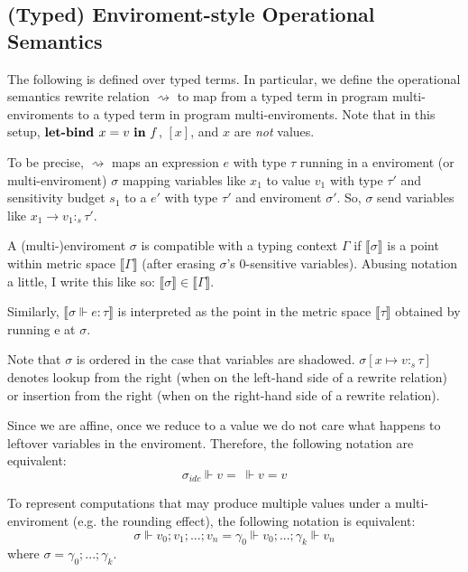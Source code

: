 \subsection{(Typed) Enviroment-style Operational Semantics}
The following is defined over typed terms. In particular, we define the
operational semantics rewrite relation $\rightsquigarrow$ to map from a typed
term in program multi-enviroments to a typed term in program multi-enviroments. Note
that in this setup, $\textbf{let-bind } x = v \ \textbf{in} \ f$, $[x]$, and $x$ are \textit{not}
values.

To be precise, $\rightsquigarrow$ maps an expression $e$ with type $\tau$
running in a enviroment (or multi-enviroment) $\sigma$ mapping variables like
$x_1$ to value $v_1$ with type $\tau'$ and sensitivity budget $s_1$ to a $e'$
with type $\tau'$ and enviroment $\sigma'$. So, $\sigma$ send variables like
$x_1 \to v_1 :_s \tau'$.

A (multi-)enviroment $\sigma$ is compatible with a typing context $\Gamma$ if
$\llbracket \sigma \rrbracket$ is a point within metric space $\llbracket \Gamma
\rrbracket$ (after erasing $\sigma$'s $0$-sensitive variables). Abusing notation
a little, I write this like so: $\llbracket \sigma \rrbracket \in \llbracket
\Gamma \rrbracket$.


Similarly, $\llbracket \sigma \Vdash e : \tau \rrbracket$ is
interpreted as the point in the metric space $\llbracket \tau \rrbracket$
obtained by running e at $\sigma$.

Note that $\sigma$ is ordered in the case that variables are shadowed. $\sigma[x
\mapsto v :_s \tau]$ denotes lookup from the right (when on the left-hand side
of a rewrite relation) or insertion from the right (when on the right-hand side
of a rewrite relation).

Since we are affine, once we reduce to a value we do not care what happens to
leftover variables in the enviroment. Therefore, the following notation are
equivalent:
$$
\sigma_{idc} \Vdash v = \ \Vdash v = v
$$

To represent computations that may produce multiple values under a
multi-enviroment (e.g. the rounding effect), the following notation is
equivalent:
$$
\sigma \Vdash v_0;v_1;...;v_n = \gamma_0 \Vdash v_0;...; \gamma_k \Vdash v_n
$$
where $\sigma =  \gamma_0;...;\gamma_k$.

